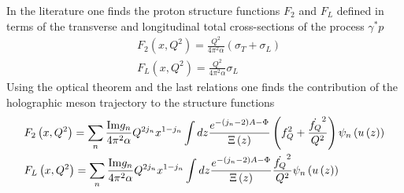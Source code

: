 \documentclass[10 pt]{article}
\begin{document}
In the literature one finds the proton structure functions $F_2$ and $F_L$ defined in terms of the transverse and longitudinal total cross-sections of the process $\gamma^{*} p$
\begin{align}
&F_2\left(x, Q^2\right) = \frac{Q^2}{4 \pi^2 \alpha} \left(\sigma_T + \sigma_L\right) \\
&F_L\left(x, Q^2\right) = \frac{Q^2}{4 \pi^2 \alpha} \sigma_L
\end{align}
Using the optical theorem and the last relations one finds the contribution of the holographic meson trajectory to the structure functions 
\begin{align}
&F_2\left(x, Q^2\right) = \sum_n \frac{{\rm Im} g_n }{4\pi^2 \alpha} Q^{2 j_n} x^{1-j_n} \int dz \frac{e^{-\left(j_n - 2 \right)A - \Phi}}{\Xi\left(z\right)} \left(f_Q^2 +\frac{\dot{f_Q}^2}{Q^2} \right) \psi_n\left(u\left(z\right)\right)\\
&F_L\left(x, Q^2\right) = \sum_n \frac{{\rm Im} g_n }{4\pi^2 \alpha} Q^{2 j_n} x^{1-j_n} \int dz \frac{e^{-\left(j_n - 2 \right)A - \Phi}}{\Xi\left(z\right)} \frac{\dot{f_Q}^2}{Q^2} \psi_n\left(u\left(z\right)\right)
\end{align}






























































\end{document}
